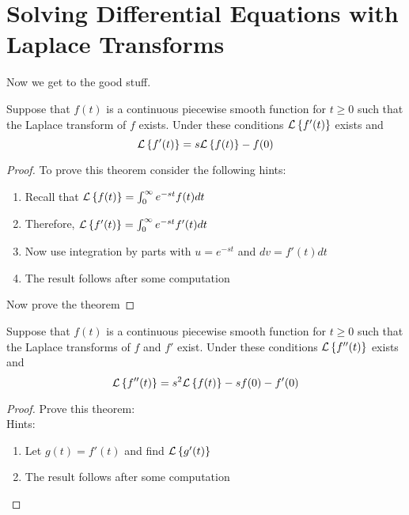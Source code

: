 \section{Solving Differential Equations with Laplace Transforms}
Now we get to the good stuff.
\begin{thm}
    Suppose that $f(t)$ is a continuous piecewise smooth function for $t \ge 0$ such that
    the Laplace transform of $f$ exists.  Under these conditions $\mathcal{L}\left\{ f'(t) \right\}$ exists and
    \[ \mathcal{L}\left\{ f'(t) \right\} = s \mathcal{L}\left\{ f(t) \right\} - f(0) \]
\end{thm}
\begin{proof}
    To prove this theorem consider the following hints:
    \begin{enumerate}
        \item Recall that $\mathcal{L}\left\{ f(t) \right\} = \int_0^\infty e^{-st} f(t) dt$
        \item Therefore, $\mathcal{L}\left\{ f'(t) \right\} = \int_0^\infty e^{-st} f'(t) dt$
        \item Now use integration by parts with $u=e^{-st}$ and $dv = f'(t) dt$
        \item The result follows after some computation
    \end{enumerate}
   Now prove the theorem
\end{proof}


\begin{thm}
    Suppose that $f(t)$ is a continuous piecewise smooth function for $t \ge 0$ such that
    the Laplace transforms of $f$ and $f'$ exist.  Under these conditions $\mathcal{L}\left\{ f''(t) \right\}$
    exists and
    \[ \mathcal{L}\left\{ f''(t) \right\} = s^2 \mathcal{L}\left\{ f(t) \right\} - sf(0) - f'(0) \]
\end{thm}
\begin{proof}
    Prove this theorem: \\
    Hints:
    \begin{enumerate}
        \item Let $g(t) = f'(t)$ and find $\mathcal{L}\left\{ g'(t) \right\}$
        \item The result follows after some computation
    \end{enumerate}
\end{proof}

